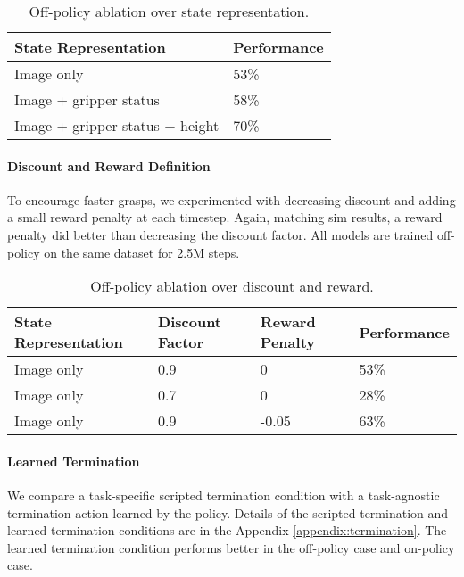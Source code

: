 \documentclass{article}
\begin{document}
\begin{table}[h]
\begin{center}
\begin{tabular}{ |p{12em}|p{7em}| }
\hline
State Representation & Performance \\
\hline
Image only & 53\% \\ %
\hline
Image + gripper status & 58\% \\ %
\hline
Image + gripper status + height & 70\% \\ %
\hline
\end{tabular}
\end{center}
\caption{Off-policy ablation over state representation.}
\label{table:state-repr-ablation}
\vspace{-0.25in}
\end{table}\paragraph{Discount and Reward Definition}
To encourage faster grasps, we experimented with decreasing discount and adding a small reward penalty at each timestep. Again, matching sim results, a reward penalty did better than decreasing the discount factor. All models are trained off-policy on the same dataset for 2.5M steps.
\begin{table}[h]
\label{table:learning-ablation}
\begin{center}
\begin{tabular}{|p{12em}|p{7em}|p{7em}|p{7em}|}
\hline
State Representation & Discount Factor & Reward Penalty & Performance  \\
\hline
Image only & 0.9 & 0 & 53\% \\ %
\hline
Image only & 0.7 & 0 & 28\% \\ %
\hline
Image only & 0.9 & -0.05 & 63\% \\ %
\hline
\end{tabular}
\end{center}
\caption{Off-policy ablation over discount and reward.}
\vspace{-0.3in}
\end{table}\paragraph{Learned Termination}
We compare a task-specific scripted termination condition with a task-agnostic termination action learned by the policy. Details of the scripted termination and learned termination conditions are in the Appendix \ref{appendix:termination}. The learned termination condition performs better in the off-policy case and on-policy case.
\end{document}
